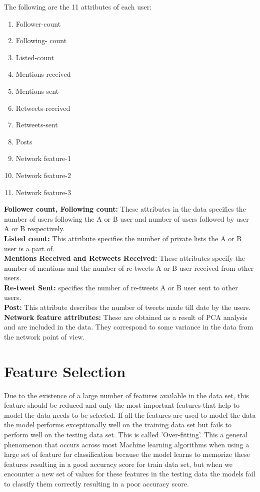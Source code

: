 \documentclass[sigconf]{acmart}
\begin{document}
The following are the 11 attributes of each user:
\begin{enumerate}
    \item Follower-count
    \item Following- count
    \item Listed-count
    \item Mentions-received
    \item Mentions-sent
    \item Retweets-received
    \item Retweets-sent
    \item Posts 
    \item Network feature-1
    \item Network feature-2
    \item Network feature-3 
\end{enumerate}
\textbf{Follower count, Following count:} These attributes in the data specifies the number of users following the A or B user and number of users followed by user A or B respectively. \\
\textbf{Listed count:} This attribute specifies the number of private lists the A or B user is a part of.\\
\textbf{Mentions Received and Retweets Received:} These attributes specify the number of mentions and the number of re-tweets A or B user received from other users.\\
\textbf{Re-tweet Sent:} specifies the number of re-tweets A or B user sent to other users.\\
\textbf{Post:} This attribute describes the number of tweets made till date by the users.\\
\textbf{Network feature attributes:} These are obtained as a result of PCA analysis and are included in the data. They correspond to some variance in the data from the network point of view.


\section{Feature Selection}

Due to the existence of a large number of features available in the data set, this feature should be reduced and only the most important features that help to model the data needs to be selected. If all the features are used to model the data the model performs exceptionally well on the training data set but fails to perform well on the testing data set. This is called 'Over-fitting'. This a general phenomenon that occurs across most Machine learning algorithms when using a large set of feature for classification because the model learns to memorize these features resulting in a good accuracy score for train data set, but when we encounter a new set of values for these features in the testing data the models fail to classify them correctly resulting in a poor accuracy score.
\end{document}

